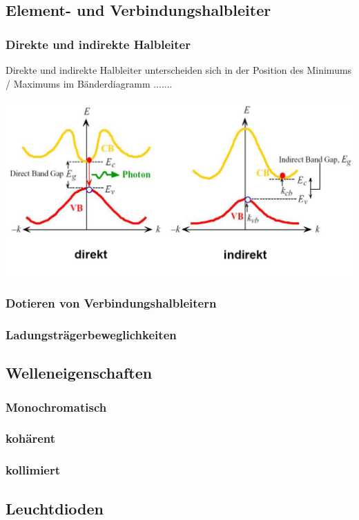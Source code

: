 \subsection{Element- und Verbindungshalbleiter}
	\subsubsection{Direkte und indirekte Halbleiter}
	Direkte und indirekte Halbleiter unterscheiden sich in der Position des Minimums / Maximums im Bänderdiagramm .......
	
		\includegraphics[width=\linewidth]{Kapitel/Kap11/direkte_indirekte_halbleiter.PNG}
	
	\subsubsection{Dotieren von Verbindungshalbleitern}	
	\subsubsection{Ladungsträgerbeweglichkeiten}
\subsection{Welleneigenschaften}
	\subsubsection{Monochromatisch} 
	\subsubsection{kohärent} \subsubsection{kollimiert}
\subsection{Leuchtdioden}

